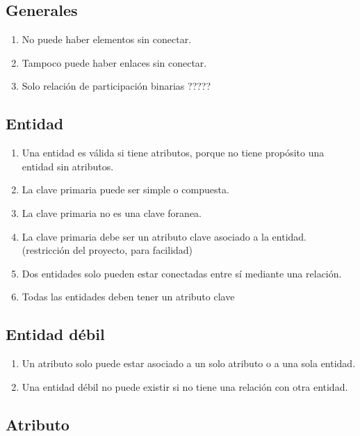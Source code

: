 \subsection*{Generales}
\begin{enumerate}
    \item No puede haber elementos sin conectar.
    \item Tampoco puede haber enlaces sin conectar.
    \item Solo relación de participación binarias ?????
\end{enumerate}



\subsection*{Entidad}
\begin{enumerate}
    \item Una entidad es válida si tiene atributos, porque no tiene propósito una entidad sin atributos.
    \item La clave primaria puede ser simple o compuesta.
    \item La clave primaria no es una clave foranea.
    \item La clave primaria debe ser un atributo clave asociado a la entidad. (restricción del proyecto, para facilidad)
    \item Dos entidades solo pueden estar conectadas entre sí mediante una relación.
    \item Todas las entidades deben tener un atributo clave
\end{enumerate}

\subsection*{Entidad débil}
\begin{enumerate}
    \item Un atributo solo puede estar asociado a un solo atributo o a una sola entidad.
    \item Una entidad débil no puede existir si no tiene una relación con otra entidad.
\end{enumerate}

\subsection*{Atributo}

